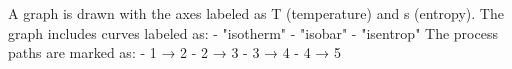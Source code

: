 A graph is drawn with the axes labeled as T (temperature) and s (entropy). The graph includes curves labeled as:  
- "isotherm"  
- "isobar"  
- "isentrop"  
The process paths are marked as:  
- 1 → 2  
- 2 → 3  
- 3 → 4  
- 4 → 5